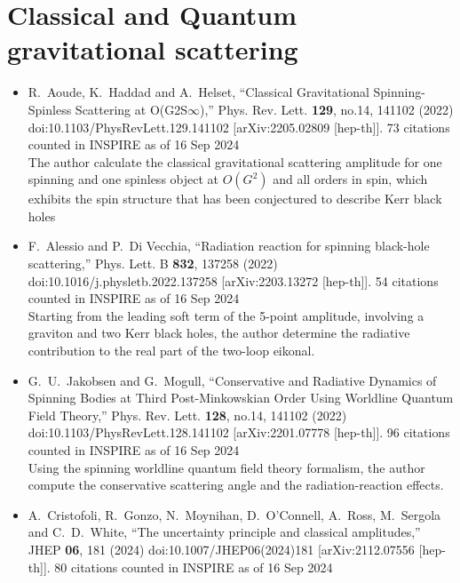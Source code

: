 \documentclass[a4paper,12pt]{article}
\begin{document}
\section*{Classical and Quantum gravitational scattering}
\begin{itemize}
    \item %
    R.~Aoude, K.~Haddad and A.~Helset,
    ``Classical Gravitational Spinning-Spinless Scattering at O(G2S\ensuremath{\infty}),''
    Phys. Rev. Lett. \textbf{129}, no.14, 141102 (2022)\\
    doi:10.1103/PhysRevLett.129.141102
    [arXiv:2205.02809 [hep-th]].
    73 citations counted in INSPIRE as of 16 Sep 2024\\
    The author calculate
    the classical gravitational scattering amplitude for one spinning and one spinless object at $O(G^2)$
    and all orders in spin, which exhibits the spin structure that has been
    conjectured to describe Kerr black holes
    \item %
    F.~Alessio and P.~Di Vecchia,
    ``Radiation reaction for spinning black-hole scattering,''
    Phys. Lett. B \textbf{832}, 137258 (2022)
    doi:10.1016/j.physletb.2022.137258
    [arXiv:2203.13272 [hep-th]].
    54 citations counted in INSPIRE as of 16 Sep 2024\\
    Starting from the leading soft term of the 5-point amplitude, involving a graviton and two Kerr black holes, the author determine the
    radiative contribution to the real part of the two-loop eikonal.
    \item %
    G.~U.~Jakobsen and G.~Mogull,
    ``Conservative and Radiative Dynamics of Spinning Bodies at Third Post-Minkowskian Order Using Worldline Quantum Field Theory,''
    Phys. Rev. Lett. \textbf{128}, no.14, 141102 (2022)
    doi:10.1103/PhysRevLett.128.141102
    [arXiv:2201.07778 [hep-th]].
    96 citations counted in INSPIRE as of 16 Sep 2024\\
    Using the spinning worldline quantum field theory formalism, the author compute the conservative scattering angle and the radiation-reaction effects.
    \item %
    A.~Cristofoli, R.~Gonzo, N.~Moynihan, D.~O'Connell, A.~Ross, M.~Sergola and C.~D.~White,
    ``The uncertainty principle and classical amplitudes,''
    JHEP \textbf{06}, 181 (2024)
    doi:10.1007/JHEP06(2024)181
    [arXiv:2112.07556 [hep-th]].
    80 citations counted in INSPIRE as of 16 Sep 2024\\

\end{itemize}
\end{document}
